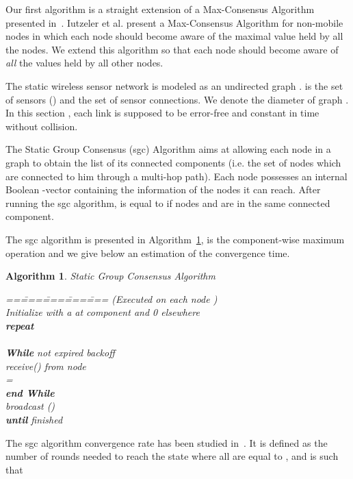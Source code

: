 \documentclass{sig-alternate}
\begin{document}
Our first  algorithm is a straight extension of a Max-Consensus Algorithm presented in~\cite{Iutzeler2012}. Iutzeler et al. present a Max-Consensus Algorithm for non-mobile nodes in which  each node should become aware of the maximal value held by all the nodes. We  extend this algorithm so that each node should become aware of {\em all} the values held by all other nodes. 

The static wireless sensor network is modeled as an undirected graph
.   is the set of sensors ()  and  the set of sensor connections.  
We denote  the diameter of graph . 
In this section \newcommand{\iid}{i.i.d}, each link is supposed to be error-free and
constant in time without collision.


\newcommand{\sgc}{\sc sgc}

The Static Group Consensus ({\sgc}) Algorithm aims at allowing each
node in a graph to obtain the list of its connected components (i.e. the set of nodes which are connected to
him through a multi-hop path).
Each node  possesses an internal Boolean -vector  containing
the information of the nodes it can reach. After running the {\sgc}
algorithm,  is equal to  if nodes  and  are in the same
connected component.


\newtheorem{algorithm}[equation]{Algorithm}

The {\sgc} algorithm is presented in Algorithm~\ref{algo1},  is
the component-wise maximum operation 
and we give below an estimation of the convergence time.


\begin{algorithm}
\label{algo1}
{\sc Static Group Consensus Algorithm }
\begin{tabbing}
==\= ===\= ===\= ===\= ===\kill
(Executed on each node )\+ \\
Initialize  with a  at component  and 0 elsewhere\\ 
{\bf repeat}\+\\
\\
{\bf While}  not expired backoff  \+ \\
receive() from node \\
=\-\\
{\bf end While}\\
broadcast ()\-\\
{\bf until}  finished
\end{tabbing}
\end{algorithm}

\newcommand{\setone}{\bold{1}}

The {\sgc} algorithm convergence rate has been studied in~\cite{mobihoc}. It is defined as the number of rounds  needed to reach the state where all  are equal to , and is such that
\end{document}
